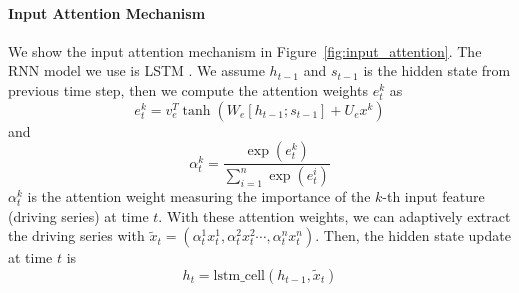 \documentclass[11pt,a4paper]{article}
\begin{document}
\paragraph{Input Attention Mechanism}
We show the input attention mechanism in Figure~\ref{fig:input_attention}. The RNN model we use is LSTM \cite{lstm}. We assume $h_{t-1}$ and $s_{t-1}$ is the hidden state from previous time step, then we compute the attention weights $e_{t}^{k}$ as 
\begin{equation}
e_{t}^{k}=v_{e}^T\tanh (W_e[h_{t-1}; s_{t-1}]+U_ex^k)
\end{equation}
and
\begin{equation}
\alpha^{k}_{t}=\frac{\exp(e^{k}_{t})}{\sum_{i=1}^{n}\exp(e^{i}_{t})}
\end{equation}
$\alpha^{k}_{t}$ is the attention weight measuring the importance of the $k$-th input feature (driving series) at time $t$. With these attention weights, we can adaptively extract the driving series with $\tilde{x}_t=(\alpha^1_{t}x^1_{t}, \alpha^2_{t}x^2_{t}\cdots, \alpha^n_{t}x^n_{t})$. Then, the hidden state update at time $t$ is
\begin{equation}
h_t=\text{lstm\_cell}(h_{t-1}, \tilde{x}_t)
\end{equation}
\end{document}
